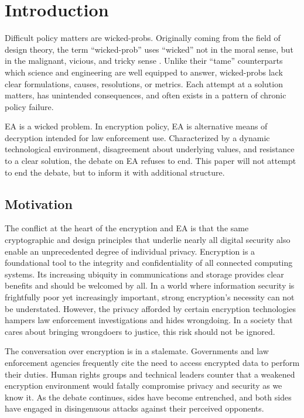 \chapter{Introduction}
\label{chap-introduction}

Difficult policy matters are \acp{wicked-prob}. Originally coming from the field of design theory, the term
``\ac{wicked-prob}'' uses ``wicked'' not in the moral sense, but in the malignant, vicious, and tricky sense
\cite{rittel_dilemmas_1973}. Unlike their ``tame'' counterparts which science and engineering are well equipped to
answer, \acp{wicked-prob} lack clear formulations, causes, resolutions, or metrics. Each attempt at a solution matters,
has unintended consequences, and often exists in a pattern of chronic policy failure.

\Acl{EA} is a wicked problem. In encryption policy, \ac{EA} is alternative means of decryption intended for law
enforcement use. Characterized by a dynamic technological environment, disagreement about underlying values, and
resistance to a clear solution, the debate on \ac{EA} refuses to end. This paper will not attempt to end the debate, but
to inform it with additional structure.


\section{Motivation}
\label{sec-motivation}

The conflict at the heart of the encryption and \ac{EA} is that the same cryptographic and design principles that
underlie nearly all digital security also enable an unprecedented degree of individual privacy. Encryption is a
foundational tool to the integrity and confidentiality of all connected computing systems. Its increasing ubiquity in
communications and storage provides clear benefits and should be welcomed by all. In a world where information security
is frightfully poor yet increasingly important, strong encryption's necessity can not be understated. However, the
privacy afforded by certain encryption technologies hampers law enforcement investigations and hides wrongdoing. In a
society that cares about bringing wrongdoers to justice, this risk should not be ignored.

The conversation over encryption is in a stalemate. Governments and law enforcement agencies frequently cite the need to
access encrypted data to perform their duties. Human rights groups and technical leaders counter that a weakened
encryption environment would fatally compromise privacy and security as we know it. As the debate continues, sides have
become entrenched, and both sides have engaged in disingenuous attacks against their perceived opponents.

